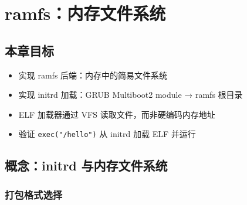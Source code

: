 \chapter{ramfs：内存文件系统}
\label{ch:ramfs}

\section{本章目标}

\begin{itemize}
  \item 实现 ramfs 后端：内存中的简易文件系统
  \item 实现 initrd 加载：GRUB Multiboot2 module → ramfs 根目录
  \item ELF 加载器通过 VFS 读取文件，而非硬编码内存地址
  \item 验证 \texttt{exec("/hello")} 从 initrd 加载 ELF 并运行
\end{itemize}

\section{概念：initrd 与内存文件系统}
\label{sec:ramfs-concept}


\subsection{打包格式选择}


